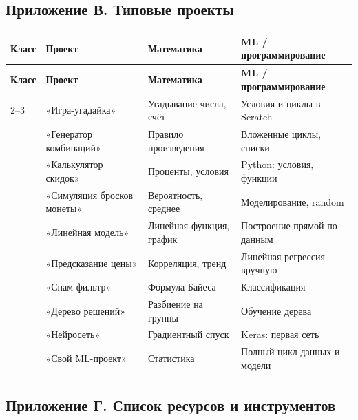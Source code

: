 \documentclass[12pt,a4paper]{article}
\begin{document}
\subsection{Приложение В. Типовые проекты}

\begin{longtable}{L{2.2cm}L{4.2cm}L{3.4cm}L{4.2cm}}
\toprule
\textbf{Класс} & \textbf{Проект} & \textbf{Математика} & \textbf{ML / программирование}\\
\midrule
\endfirsthead

\toprule
\textbf{Класс} & \textbf{Проект} & \textbf{Математика} & \textbf{ML / программирование}\\
\midrule
\endhead

2--3 & «Игра-угадайка» & Угадывание числа,
счёт & Условия и циклы в Scratch\\
 & «Генератор комбинаций» & Правило произведения & Вложенные циклы,
списки\\
 & «Калькулятор скидок» & Проценты, условия & Python: условия,
функции\\
 & «Симуляция бросков монеты» & Вероятность, среднее & Моделирование,
random\\
 & «Линейная модель» & Линейная функция, график & Построение
прямой по данным\\
 & «Предсказание цены» & Корреляция, тренд & Линейная
регрессия вручную\\
 & «Спам-фильтр» & Формула Байеса & Классификация\\
 & «Дерево решений» & Разбиение на группы & Обучение дерева\\
 & «Нейросеть» & Градиентный спуск & Keras: первая сеть\\
 & «Свой ML-проект» & Статистика & Полный цикл
данных и модели\\
\bottomrule
\end{longtable}

\subsection{Приложение Г. Список ресурсов и инструментов}
\end{document}
